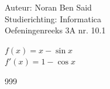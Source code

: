 \documentclass[a4paper]{article}
\begin{document}
  
\noindent \large Auteur: Noran Ben Said \\
\noindent \large Studierichting: Informatica\\
\noindent \large Oefeningenreeks 3A nr. 10.1\\

\medskip

\normalsize

$f(x) = x- \sin x $\\

$f'(x) = 1 - \cos x $\\

\begin{thebibliography}{999}
\end{thebibliography}
\end{document}
